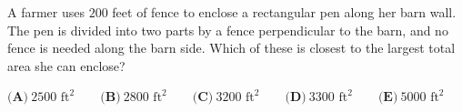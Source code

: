 A farmer uses $200$ feet of fence to enclose a rectangular pen along her barn wall. The pen is divided into two parts by a fence perpendicular to the barn, and no fence is needed along the barn side. Which of these is closest to the largest total area she can enclose?

$\textbf{(A)}\ 2500\text{ ft}^2\qquad\textbf{(B)}\ 2800\text{ ft}^2\qquad\textbf{(C)}\ 3200\text{ ft}^2\qquad\textbf{(D)}\ 3300\text{ ft}^2\qquad\textbf{(E)}\ 5000\text{ ft}^2$

